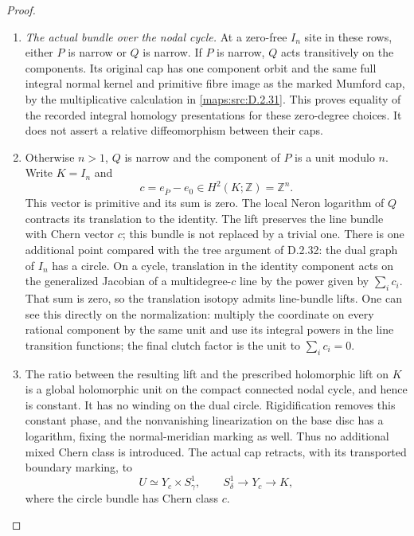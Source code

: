 \begin{proof}
\begin{enumerate}[label=\arabic*.,leftmargin=*]
\item \emph{The actual bundle over the nodal cycle.}
At a zero-free $I_n$ site in these rows, either $P$ is
narrow or $Q$ is narrow. If $P$ is narrow, $Q$ acts
transitively on the components. Its original cap has
one component orbit and the same full integral normal
kernel and primitive fibre image as the marked Mumford
cap, by the multiplicative calculation in \ref{maps:src:D.2.31}.
This proves equality of the recorded integral homology
presentations for these zero-degree choices. It does not
assert a relative diffeomorphism between their caps.

\item Otherwise $n>1$, $Q$ is narrow and the component of $P$
is a unit modulo $n$. Write $K=I_n$ and
\[
 c=e_{\overline P}-e_0\in H^2(K;\mathbb Z)=\mathbb Z^n .
\]
This vector is primitive and its sum is zero. The local
Neron logarithm of $Q$ contracts its translation to the
identity. The lift preserves the line bundle with Chern
vector $c$; this bundle is not replaced by a trivial one.
There is one additional point compared with the tree
argument of D.2.32: the dual graph of $I_n$ has a circle.
On a cycle, translation in the identity component acts
on the generalized Jacobian of a multidegree-$c$ line
by the power given by $\sum_i c_i$. That sum is zero,
so the translation isotopy admits line-bundle lifts.
One can see this directly on the normalization: multiply
the coordinate on every rational component by the same
unit and use its integral powers in the line transition
functions; the final clutch factor is the unit to
$\sum_i c_i=0$.

\item The ratio between the resulting lift and the prescribed
holomorphic lift on $K$ is a global holomorphic unit on
the compact connected nodal cycle, and hence is constant.
It has no winding on the dual circle. Rigidification
removes this constant phase, and the nonvanishing
linearization on the base disc has a logarithm, fixing
the normal-meridian marking as well. Thus no additional
mixed Chern class is introduced. The actual cap retracts,
with its transported boundary marking, to
\[
 U\simeq Y_c\times S^1_\gamma,\qquad
 S^1_\delta\longrightarrow Y_c\longrightarrow K,           \tag{D.OM3}\label{maps:eq:D.OM3}
\]
where the circle bundle has Chern class $c$.


\end{enumerate}
\end{proof}
